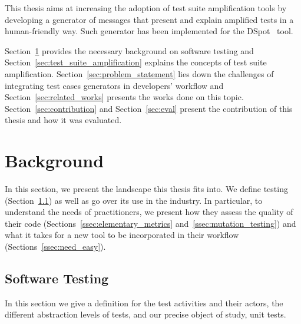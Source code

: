 \documentclass[a4paper,11pt]{sdm_internship}
\newcommand{\todo}[1]{\colorbox{Red!75}{\textcolor{white}{\textbf{TODO\ifx&#1&\else: #1\fi}}}}
\newcommand{\dspot}{DSpot\xspace}
\theoremstyle{definition}
\begin{document}
This thesis aims at increasing the adoption of test suite amplification tools by developing a generator of messages that present and explain amplified tests in a human-friendly way.
Such generator has been implemented for the \dspot{}~\cite{baudry2015dspot} tool.

Section~\ref{sec:background} provides the necessary background on software testing and Section~\ref{sec:test_suite_amplification} explains the concepts of test suite amplification.
Section~\ref{sec:problem_statement} lies down the challenges of integrating test cases generators in developers' workflow and Section~\ref{sec:related_works} presents the works done on this topic.
Section~\ref{sec:contribution} and Section~\ref{sec:eval} present the contribution of this thesis and how it was evaluated.



\section{Background}%
\label{sec:background}
In this section, we present the landscape this thesis fits into.
We define testing (Section~\ref{ssec:software_testing}) as well as go over its use in the industry.
In particular, to understand the needs of practitioners, we present how they assess the quality of their code (Sections~\ref{ssec:elementary_metrics} and~\ref{ssec:mutation_testing}) and what it takes for a new tool to be incorporated in their workflow (Sections~\ref{ssec:need_easy}).

\subsection{Software Testing}%
\label{ssec:software_testing}
In this section we give a definition for the test activities and their actors, the different abstraction levels of tests, and our precise object of study, unit tests.



\end{document}
